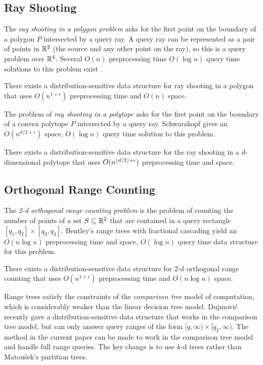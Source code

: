 \documentclass{patmorin}
\begin{document}
\subsection{Ray Shooting}

The \emph{ray shooting in a polygon problem} asks for the first point
on the boundary of a polygon $P$ intersected by a query ray.  A query
ray can be represented as a pair of points in $\mathbb{R}^2$ (the source and
any other point on the ray), so this is a query problem over $\mathbb{R}^4$.
Several $O(n)$ preprocessing time $O(\log n)$ query time solutions to
this problem exist \cite{X,Y,Z,W}.

\begin{thm}
  There exists a distribution-sensitive data structure for ray shooting
  in a polygon that uses $O(n^{1+\epsilon})$ preprocessing time and
  $O(n)$ space.
\end{thm}

The problem of \emph{ray shooting in a polytope} asks for the first point
on the boundary of a convex polytope $P$ intersected by a query ray.
Schwarzkopf gives an $O(n^{{d/2}+\epsilon})$ space, $O(\log n)$ query
time solution to this problem.

\begin{thm}
  There exists a distribution-sensitive data structure for
  the ray shooting in a $d$-dimensional polytope that uses
  $O(n^{{\left\lfloor d/2 \right\rfloor}+\epsilon})$ preprocessing time and space.
\end{thm}

\subsection{Orthogonal Range Counting}

The \emph{2-d orthogonal range counting problem} is the problem of
counting the number of points of a set $S\subseteq\mathbb{R}^2$ that are contained
in a query rectangle $[q_1,q_2]\times[q_3,q_4]$.  Bentley's range trees
\cite{bXX} with fractional cascading \cite{yy} yield an $O(n\log n)$
preprocessing time and space, $O(\log n)$ query time data structure for
this problem.

\begin{thm}
  There exists a distribution-sensitive data structure for 2-d orthogonal
  range counting that uses $O(n^{1+\epsilon})$ preprocessing time and
  $O(n\log n)$ space.
\end{thm}

Range trees satisfy the constraints of the \emph{comparison tree} model
of computation, which is considerably weaker than the linear decision tree
model. Dujmovi\'c \etal\ \cite{XX} recently gave a distribution-sensitive
data structure that works in the comparison tree model, but can
only answer query ranges of the form $[q,\infty)\times[q_2,\infty)$.
The method in the current paper can be made to work in the comparison
tree model and handle full range queries.  The key change is to use
$k$-d trees rather than Matou\v{s}ek's partition trees.
\end{document}
